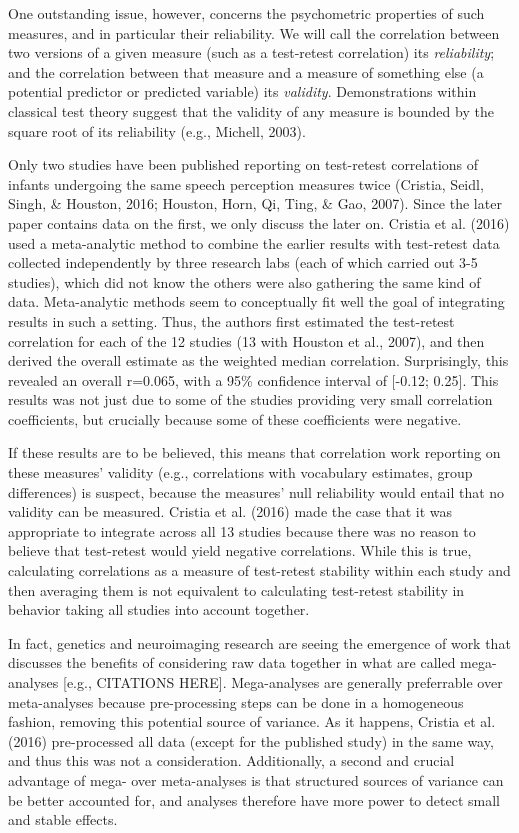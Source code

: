 \documentclass[man]{apa6}
\begin{document}
One outstanding issue, however, concerns the psychometric properties of
such measures, and in particular their reliability. We will call the
correlation between two versions of a given measure (such as a
test-retest correlation) its \emph{reliability}; and the correlation
between that measure and a measure of something else (a potential
predictor or predicted variable) its \emph{validity}. Demonstrations
within classical test theory suggest that the validity of any measure is
bounded by the square root of its reliability (e.g., Michell, 2003).

Only two studies have been published reporting on test-retest
correlations of infants undergoing the same speech perception measures
twice (Cristia, Seidl, Singh, \& Houston, 2016; Houston, Horn, Qi, Ting,
\& Gao, 2007). Since the later paper contains data on the first, we only
discuss the later on. Cristia et al. (2016) used a meta-analytic method
to combine the earlier results with test-retest data collected
independently by three research labs (each of which carried out 3-5
studies), which did not know the others were also gathering the same
kind of data. Meta-analytic methods seem to conceptually fit well the
goal of integrating results in such a setting. Thus, the authors first
estimated the test-retest correlation for each of the 12 studies (13
with Houston et al., 2007), and then derived the overall estimate as the
weighted median correlation. Surprisingly, this revealed an overall
r=0.065, with a 95\% confidence interval of {[}-0.12; 0.25{]}. This
results was not just due to some of the studies providing very small
correlation coefficients, but crucially because some of these
coefficients were negative.

If these results are to be believed, this means that correlation work
reporting on these measures' validity (e.g., correlations with
vocabulary estimates, group differences) is suspect, because the
measures' null reliability would entail that no validity can be
measured. Cristia et al. (2016) made the case that it was appropriate to
integrate across all 13 studies because there was no reason to believe
that test-retest would yield negative correlations. While this is true,
calculating correlations as a measure of test-retest stability within
each study and then averaging them is not equivalent to calculating
test-retest stability in behavior taking all studies into account
together.

In fact, genetics and neuroimaging research are seeing the emergence of
work that discusses the benefits of considering raw data together in
what are called mega-analyses {[}e.g., CITATIONS HERE{]}. Mega-analyses
are generally preferrable over meta-analyses because pre-processing
steps can be done in a homogeneous fashion, removing this potential
source of variance. As it happens, Cristia et al. (2016) pre-processed
all data (except for the published study) in the same way, and thus this
was not a consideration. Additionally, a second and crucial advantage of
mega- over meta-analyses is that structured sources of variance can be
better accounted for, and analyses therefore have more power to detect
small and stable effects.
\end{document}
